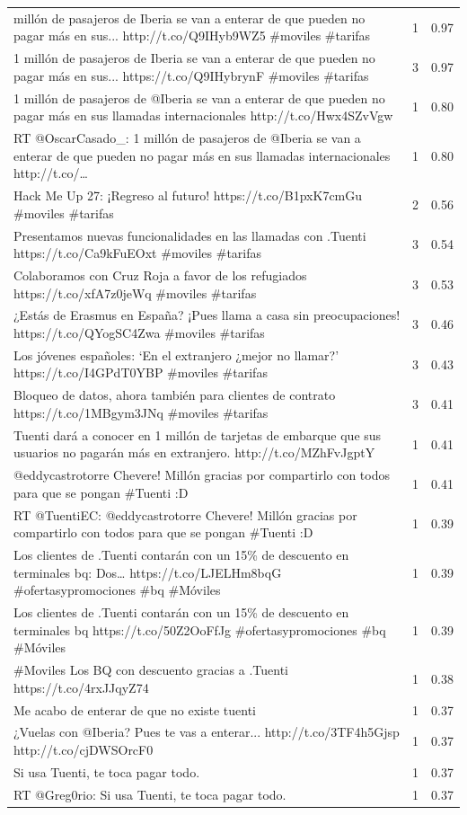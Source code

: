 \begin{longtable}{p{12.5cm}rr}
\bottomrule
\endlastfoot
1 millón de pasajeros de Iberia se van a enterar de que pueden no pagar más en sus... http://t.co/Q9IHyb9WZ5 \#moviles \#tarifas & 1 & 0.97 \\
1 millón de pasajeros de Iberia se van a enterar de que pueden no pagar más en sus... https://t.co/Q9IHybrynF \#moviles \#tarifas & 3 & 0.97 \\
1 millón de pasajeros de @Iberia se van a enterar de que pueden no pagar más en sus llamadas internacionales http://t.co/Hwx4SZvVgw & 1 & 0.80 \\
RT @OscarCasado\_: 1 millón de pasajeros de @Iberia se van a enterar de que pueden no pagar más en sus llamadas internacionales http://t.co/… & 1 & 0.80 \\
Hack Me Up 27: ¡Regreso al futuro! https://t.co/B1pxK7cmGu \#moviles \#tarifas & 2 & 0.56 \\
Presentamos nuevas funcionalidades en las llamadas con .Tuenti https://t.co/Ca9kFuEOxt \#moviles \#tarifas & 3 & 0.54 \\
Colaboramos con Cruz Roja a favor de los refugiados https://t.co/xfA7z0jeWq \#moviles \#tarifas & 3 & 0.53 \\
¿Estás de Erasmus en España? ¡Pues llama a casa sin preocupaciones! https://t.co/QYogSC4Zwa \#moviles \#tarifas & 3 & 0.46 \\
Los jóvenes españoles: ‘En el extranjero ¿mejor no llamar?’ https://t.co/I4GPdT0YBP \#moviles \#tarifas & 3 & 0.43 \\
Bloqueo de datos, ahora también para clientes de contrato https://t.co/1MBgym3JNq \#moviles \#tarifas & 3 & 0.41 \\
Tuenti dará a conocer en 1 millón de tarjetas de embarque que sus usuarios no pagarán más en extranjero. http://t.co/MZhFvJgptY & 1 & 0.41 \\
@eddycastrotorre  Chevere! Millón gracias por compartirlo con todos para que se pongan \#Tuenti :D & 1 & 0.41 \\
RT @TuentiEC: @eddycastrotorre  Chevere! Millón gracias por compartirlo con todos para que se pongan \#Tuenti :D & 1 & 0.39 \\
Los clientes de .Tuenti contarán con un 15\% de descuento en terminales bq: Dos… https://t.co/LJELHm8bqG \#ofertasypromociones \#bq \#Móviles & 1 & 0.39 \\
Los clientes de .Tuenti contarán con un 15\% de descuento en terminales bq https://t.co/50Z2OoFfJg \#ofertasypromociones \#bq \#Móviles & 1 & 0.39 \\
\#Moviles Los BQ con descuento gracias a .Tuenti https://t.co/4rxJJqyZ74 & 1 & 0.38 \\
Me acabo de enterar de que no existe tuenti & 1 & 0.37 \\
¿Vuelas con @Iberia? Pues te vas a enterar... http://t.co/3TF4h5Gjsp http://t.co/cjDWSOrcF0 & 1 & 0.37 \\
Si usa Tuenti, te toca pagar todo. & 1 & 0.37 \\
RT @Greg0rio: Si usa Tuenti, te toca pagar todo. & 1 & 0.37 \\

\end{longtable}
\clearpage

